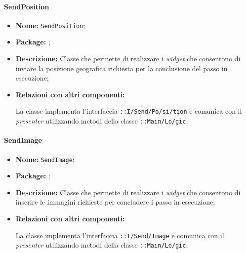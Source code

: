 \paragraph{SendPosition}
\begin{flushleft}
\begin{itemize}
\item \textbf{Nome:} \texttt{SendPosition};
\item \textbf{Package:} \texttt{\viewAdmin{}};
\item \textbf{Descrizione:} Classe che permette  di realizzare i \textit{widget} che consentono di inviare la posizione geografica richiesta per la conclusione del passo in esecuzione;
\item \textbf{Relazioni con altri componenti:}
\begin{sloppypar}
La classe implementa l'interfaccia \texttt{\iViewUser{}::I\fshyp{}Send\fshyp{}Po\fshyp{}si\fshyp{}tion} e comunica con il \textit{presenter} utilizzando metodi della classe \texttt{\logicUser{}::Main\fshyp{}Lo\fshyp{}gic}.
\end{sloppypar}
\end{itemize}
\end{flushleft}

\paragraph{SendImage}
\begin{flushleft}
\begin{itemize}
\item \textbf{Nome:} \texttt{SendImage};
\item \textbf{Package:} \texttt{\viewAdmin{}};
\item \textbf{Descrizione:} Classe che permette di realizzare i \textit{widget} che consentono di inserire le immagini richieste per concludere i passo in esecuzione;
\item \textbf{Relazioni con altri componenti:}
\begin{sloppypar}
La classe implementa l'interfaccia \texttt{\iViewUser{}::I\fshyp{}Send\fshyp{}Image} e comunica con il \textit{presenter} utilizzando metodi della classe \texttt{\logicUser{}::Main\fshyp{}Lo\fshyp{}gic}.
\end{sloppypar}
\end{itemize}
\end{flushleft}

